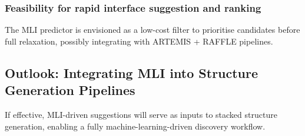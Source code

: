 \subsubsection{Feasibility for rapid interface suggestion and ranking}

The MLI predictor is envisioned as a low-cost filter to prioritise candidates before full relaxation, possibly integrating with ARTEMIS + RAFFLE pipelines.

\subsection{Outlook: Integrating MLI into Structure Generation Pipelines}

If effective, MLI-driven suggestions will serve as inputs to stacked structure generation, enabling a fully machine-learning-driven discovery workflow.

